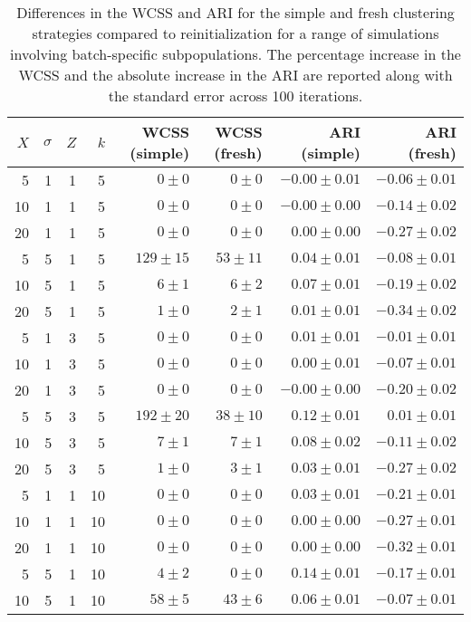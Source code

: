 \documentclass{article}
\begin{document}
\begin{table}
\caption{Differences in the WCSS and ARI for the simple and fresh clustering strategies compared to reinitialization for a range of simulations involving batch-specific subpopulations. 
The percentage increase in the WCSS and the absolute increase in the ARI are reported along with the standard error across 100 iterations.}
\label{tab:holdout-subpop}
\begin{center}
\begin{tabular}{r r r r r r r r}
\hline
$X$ & $\sigma$ & $Z$ & $k$ & WCSS (simple) & WCSS (fresh) & ARI (simple) & ARI (fresh) \\
\hline
5 & 1 & 1 & 5 & $0 \pm 0$ & $0 \pm 0$ & $-0.00 \pm 0.01$ & $-0.06 \pm 0.01$ \\
10 & 1 & 1 & 5 & $0 \pm 0$ & $0 \pm 0$ & $-0.00 \pm 0.00$ & $-0.14 \pm 0.02$ \\
20 & 1 & 1 & 5 & $0 \pm 0$ & $0 \pm 0$ & $0.00 \pm 0.00$ & $-0.27 \pm 0.02$ \\
5 & 5 & 1 & 5 & $129 \pm 15$ & $53 \pm 11$ & $0.04 \pm 0.01$ & $-0.08 \pm 0.01$ \\
10 & 5 & 1 & 5 & $6 \pm 1$ & $6 \pm 2$ & $0.07 \pm 0.01$ & $-0.19 \pm 0.02$ \\
20 & 5 & 1 & 5 & $1 \pm 0$ & $2 \pm 1$ & $0.01 \pm 0.01$ & $-0.34 \pm 0.02$ \\
5 & 1 & 3 & 5 & $0 \pm 0$ & $0 \pm 0$ & $0.01 \pm 0.01$ & $-0.01 \pm 0.01$ \\
10 & 1 & 3 & 5 & $0 \pm 0$ & $0 \pm 0$ & $0.00 \pm 0.01$ & $-0.07 \pm 0.01$ \\
20 & 1 & 3 & 5 & $0 \pm 0$ & $0 \pm 0$ & $-0.00 \pm 0.00$ & $-0.20 \pm 0.02$ \\
5 & 5 & 3 & 5 & $192 \pm 20$ & $38 \pm 10$ & $0.12 \pm 0.01$ & $0.01 \pm 0.01$ \\
10 & 5 & 3 & 5 & $7 \pm 1$ & $7 \pm 1$ & $0.08 \pm 0.02$ & $-0.11 \pm 0.02$ \\
20 & 5 & 3 & 5 & $1 \pm 0$ & $3 \pm 1$ & $0.03 \pm 0.01$ & $-0.27 \pm 0.02$ \\
5 & 1 & 1 & 10 & $0 \pm 0$ & $0 \pm 0$ & $0.03 \pm 0.01$ & $-0.21 \pm 0.01$ \\
10 & 1 & 1 & 10 & $0 \pm 0$ & $0 \pm 0$ & $0.00 \pm 0.00$ & $-0.27 \pm 0.01$ \\
20 & 1 & 1 & 10 & $0 \pm 0$ & $0 \pm 0$ & $0.00 \pm 0.00$ & $-0.32 \pm 0.01$ \\
5 & 5 & 1 & 10 & $4 \pm 2$ & $0 \pm 0$ & $0.14 \pm 0.01$ & $-0.17 \pm 0.01$ \\
10 & 5 & 1 & 10 & $58 \pm 5$ & $43 \pm 6$ & $0.06 \pm 0.01$ & $-0.07 \pm 0.01$ \\

\end{tabular}
\end{center}
\end{table}
\end{document}
